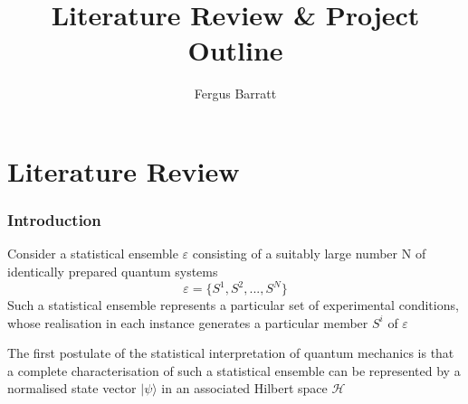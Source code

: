 \documentclass[reqno]{amsart}
\title{Literature Review \& Project Outline}
\author{Fergus Barratt}
\date{}
\begin{document}
\maketitle
%

\part{Literature Review}
\section{Introduction\autocite{Breuer2002}}
Consider a statistical ensemble $\varepsilon$ consisting of a suitably large number N of identically prepared quantum systems
\begin{equation}
	\varepsilon = \{S^1, S^2, ..., S^N\}
\end{equation}
Such a statistical ensemble represents a particular set of experimental conditions, whose realisation in each instance generates a particular member $S^i$ of  $\varepsilon$

The first postulate of the statistical interpretation of quantum mechanics is that a complete characterisation of such a statistical ensemble can be represented by a normalised state vector $| \psi \rangle$ in an associated Hilbert space $\mathcal{H}$
\end{document}
